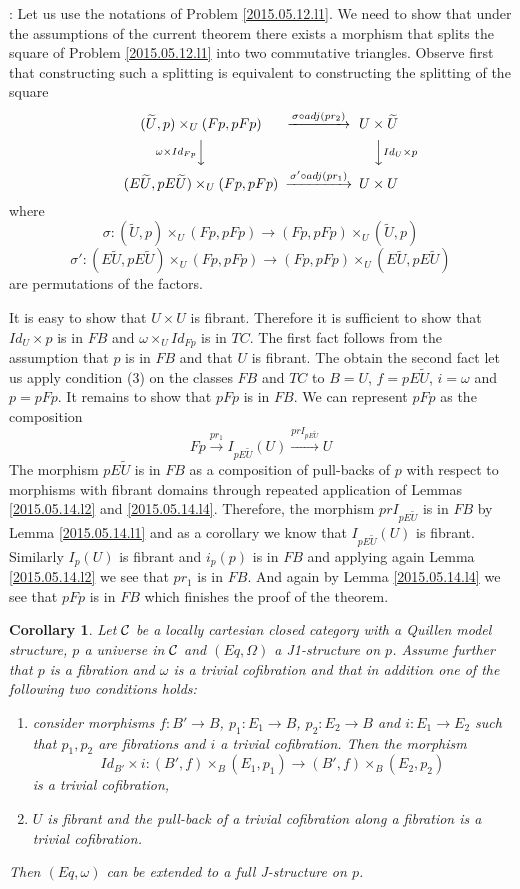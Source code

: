 \documentclass[12pt]{article}
\newenvironment{myproof}{{\bf Proof}:}{\vskip 5mm }
\newtheorem{cor}[proposition]{Corollary}
\newcommand{\llabel}[1]{\label{#1}}
\newcommand{\sr}{\rightarrow}
\newcommand{\wt}{\widetilde}
\begin{document}
\begin{myproof}
Let us use the notations of Problem \ref{2015.05.12.l1}. We need to show that under the assumptions of the current theorem there exists a morphism that splits the square of Problem \ref{2015.05.12.l1} into two commutative triangles. Observe first that constructing such a splitting is equivalent to constructing the splitting of the square
%
$$
\begin{CD}
(\wt{U},p)\times_U (Fp,pFp) @>\sigma\circ adj(pr_2)>> U\times\wt{U}\\
@V\omega \times Id_{Fp} VV @VV Id_U\times p V\\
(E\wt{U},pE\wt{U})\times_U (Fp,pFp) @>\sigma'\circ adj(pr_1)>> U\times U
\end{CD}
$$
%
where
%
$$\sigma:(\wt{U},p)\times_U (Fp,pFp)\sr (Fp,pFp)\times_U  (\wt{U},p)$$
$$\sigma':(E\wt{U},pE\wt{U})\times_U (Fp,pFp) \sr  (Fp,pFp)  \times_U  (E\wt{U},pE\wt{U})$$
%
are permutations of the factors. 

It is easy to show that $U\times U$ is fibrant. Therefore it is sufficient to show that $Id_U\times p$ is in $FB$ and $\omega\times_U Id_{Fp}$ is in $TC$. The first fact follows from the assumption that $p$ is in $FB$ and that $U$ is fibrant. The obtain the second fact let us apply condition (3) on the classes $FB$ and $TC$ to $B=U$, $f=pE\wt{U}$, $i=\omega$ and $p=pFp$.  It remains to show that $pFp$ is in $FB$. We can represent $pFp$ as the composition
%
$$Fp\stackrel{pr_1}{\sr} I_{pE\wt{U}}(U) \stackrel{prI_{pE\wt{U}}}{\sr} U$$
%
The morphism $pE\wt{U}$ is in $FB$ as a composition of pull-backs of $p$ with respect to morphisms with fibrant domains through repeated application of Lemmas \ref{2015.05.14.l2} and \ref{2015.05.14.l4}. Therefore, the morphism $prI_{pE\wt{U}}$ is in $FB$ by Lemma \ref{2015.05.14.l1} and as a corollary we know that $I_{pE\wt{U}}(U)$ is fibrant. Similarly $I_p(U)$ is fibrant and $i_p(p)$ is in $FB$ and applying again Lemma \ref{2015.05.14.l2} we see that $pr_1$ is in $FB$. And again by Lemma \ref{2015.05.14.l4} we see that $pFp$ is in $FB$ which finishes the proof of the theorem.  
\end{myproof}
%
\begin{cor}
\llabel{2015.05.18.cor1}
Let $\cal C$ be a locally cartesian closed category with a Quillen model structure, $p$ a universe in $\cal C$ and $(Eq,\Omega)$ a J1-structure on $p$. Assume further that $p$ is a fibration and $\omega$ is a trivial cofibration and that in addition one of the following two conditions holds:
%
\begin{enumerate}
\item consider morphisms $f: B'\sr B$, $p_1:E_1\sr B$, $p_2:E_2\sr B$ and $i:E_1\sr E_2$ such that $p_1,p_2$ are fibrations and $i$ a trivial cofibration. Then the morphism
%
$$Id_{B'}\times i: (B',f)\times_B(E_1,p_1)\sr (B',f)\times_B(E_2,p_2)$$
%
is a trivial cofibration,
%
\item $U$ is fibrant and the pull-back of a trivial cofibration along a fibration is a trivial cofibration.
\end{enumerate}
%
Then $(Eq,\omega)$ can be extended to a full J-structure on $p$. 
\end{cor}
%
\end{document}
